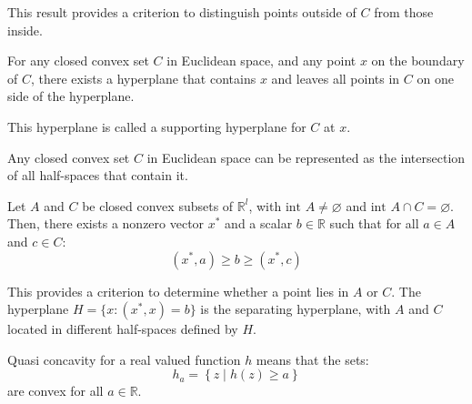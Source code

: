 This result provides a criterion to distinguish points outside of $C$ from those inside.
\begin{corollary}
    For any closed convex set $C$ in Euclidean space, and any point $x$ on the boundary of $C$, there exists a hyperplane that contains $x$ and leaves all points in $C$ on one side of the hyperplane.
\end{corollary}
This hyperplane is called a supporting hyperplane for $C$ at $x$.
\begin{corollary}
    Any closed convex set $C$ in Euclidean space can be represented as the intersection of all half-spaces that contain it.
\end{corollary}
\begin{theorem}
    Let $A$ and $C$ be closed convex subsets of $\mathbb{R}^l$, with $\text{int } A \neq\varnothing$ and $\text{int }A \cap C = \varnothing$. 
    Then, there exists a nonzero vector $x^\ast$ and a scalar $b \in \mathbb{R}$ such that for all $a \in A$ and $c \in C$:
    \[(x^\ast, a) \geq b \geq (x^\ast, c)\]
\end{theorem}
This provides a criterion to determine whether a point lies in $A$ or $C$.
The hyperplane $H = \{x : (x^\ast, x) = b\}$  is the separating hyperplane, with $A$ and $C$ located in different half-spaces defined by $H$.

\begin{definition}
    Quasi concavity for a real valued function $h$ means that the sets: 
    \[h_a=\left\{z\mid h(z)\geq a\right\}\]
    are convex for all $a\in\mathbb{R}$. 
\end{definition}